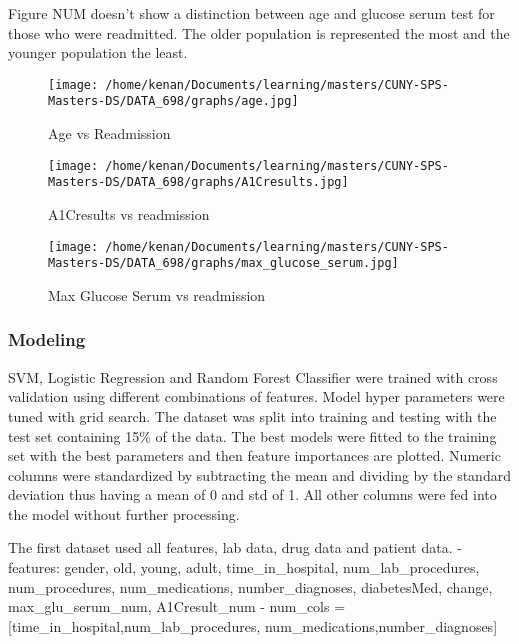 \documentclass[5p]{elsarticle} %
\begin{document}
Figure NUM doesn't show a distinction between age and glucose serum test
for those who were readmitted. The older population is represented the
most and the younger population the least.

\begin{figure}
\hypertarget{id}{%
\centering
\texttt{[image: /home/kenan/Documents/learning/masters/CUNY-SPS-Masters-DS/DATA\_698/graphs/age.jpg]}
\caption{Age vs Readmission}\label{id}
}
\end{figure}

\begin{figure}
\hypertarget{id}{%
\centering
\texttt{[image: /home/kenan/Documents/learning/masters/CUNY-SPS-Masters-DS/DATA\_698/graphs/A1Cresults.jpg]}
\caption{A1Cresults vs readmission}\label{id}
}
\end{figure}

\begin{figure}
\hypertarget{id}{%
\centering
\texttt{[image: /home/kenan/Documents/learning/masters/CUNY-SPS-Masters-DS/DATA\_698/graphs/max\_glucose\_serum.jpg]}
\caption{Max Glucose Serum vs readmission}\label{id}
}
\end{figure}

\clearpage
\twocolumn

\hypertarget{modeling}{%
\subsubsection{Modeling}\label{modeling}}

SVM, Logistic Regression and Random Forest Classifier were trained with
cross validation using different combinations of features. Model hyper
parameters were tuned with grid search. The dataset was split into
training and testing with the test set containing 15\% of the data. The
best models were fitted to the training set with the best parameters and
then feature importances are plotted. Numeric columns were standardized
by subtracting the mean and dividing by the standard deviation thus
having a mean of 0 and std of 1. All other columns were fed into the
model without further processing.

The first dataset used all features, lab data, drug data and patient
data. - features: gender, old, young, adult, time\_in\_hospital,
num\_lab\_procedures, num\_procedures, num\_medications,
number\_diagnoses, diabetesMed, change, max\_glu\_serum\_num,
A1Cresult\_num - num\_cols = {[}time\_in\_hospital,num\_lab\_procedures,
num\_medications,number\_diagnoses{]}
\end{document}
